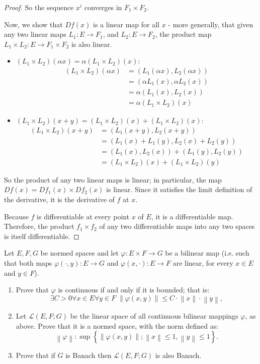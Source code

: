 \documentclass[12pt]{article}
\theoremstyle{definition}
\newenvironment{problem}[2][Problem]{\begin{trivlist}
\item[\hskip \labelsep {\bfseries #1}\hskip \labelsep {\bfseries #2.}]}{\end{trivlist}}
\begin{document}
\begin{proof}
	So the sequence $x^i$ converges in $F_1 \times F_2$.
	\par Now, we show that $Df(x)$ is a linear map for all $x$ - more generally, that given any two linear maps $L_1: E \to F_1$, and $L_2: E \to F_2$, the product map $L_1 \times L_2 : E \to F_1 \times F_2$ is also linear.
	\begin{itemize}
		\item $(L_1 \times L_2)(\alpha x) = \alpha (L_1 \times L_2)(x)$: 
			\begin{align*}
				(L_1 \times L_2)(\alpha x) &= (L_1(\alpha x), L_2(\alpha x))\\
				&= (\alpha L_1(x), \alpha L_2(x))\\
				&= \alpha (L_1(x), L_2(x))\\
				&= \alpha(L_1 \times L_2)(x)
			\end{align*}
		\item $(L_1 \times L_2)(x+y) = (L_1 \times L_2)(x) + (L_1 \times L_2)(x)$:
			\begin{align*}
				(L_1 \times L_2)(x + y) &= (L_1(x + y), L_2(x + y))\\
				&= (L_1(x) + L_1(y), L_2(x) + L_2(y))\\
				&= (L_1(x), L_2(x)) + (L_1(y), L_2(y))\\
				&= (L_1 \times L_2)(x) + (L_1 \times L_2)(y)
			\end{align*}
	\end{itemize}
	So the product of any two linear maps is linear; in particular, the map $Df(x) = Df_1(x) \times Df_2(x)$ is linear. Since it satisfies the limit definition of the derivative, it is the derivative of $f$ at $x$. 
	\par Because $f$ is differentiable at every point $x$ of $E$, it is a differentiable map. Therefore, the product $f_1 \times f_2$ of any two differentiable maps into any two spaces is itself differentiable.
\end{proof}
\begin{problem}{3}
	Let $E,F,G$ be normed spaces and let $\varphi: E \times F \to G$ be a bilinear map (i.e. such that both maps $\varphi(\cdot, y): E \to G$ and $\varphi(x, \cdot) : E \to F$ are linear, for every $x \in E$ and $y \in F$).
	\begin{enumerate}[label=(\roman*)]
		\item Prove that $\varphi$ is continuous if and only if it is bounded; that is:
			\[\exists C>0 \forall x \in E \forall y \in F \; \left \lVert { \varphi(x,y) } \right \lVert \leq C \cdot \left \lVert { x } \right \lVert \cdot \left \lVert {  y } \right \lVert, \]
		\item Let $\mathcal L(E,F;G)$ be the linear space of all continuous bilinear mappings $\varphi$, as above. Prove that it is a normed space, with the norm defined as:
			\[\left \lVert { \varphi } \right \lVert : \sup\left\{ \left \lVert { \varphi(x,y) } \right \lVert ; \left \lVert { x } \right \lVert \leq 1, \left \lVert { y } \right \lVert \leq 1 \right\}.\]
		\item Prove that if $G$ is Banach then $\mathcal L(E,F;G)$ is also Banach.
	\end{enumerate}
\end{problem}
\end{document}
